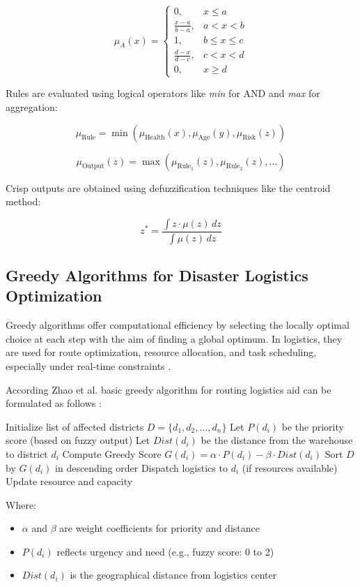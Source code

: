 \documentclass[journal,final,a4paper,twoside,11pt]{IEEEtran}
\begin{document}
\[
\mu_A(x) = 
\begin{cases}
0, & x \leq a \\
\frac{x - a}{b - a}, & a < x < b \\
1, & b \leq x \leq c \\
\frac{d - x}{d - c}, & c < x < d \\
0, & x \geq d
\end{cases}
\]

Rules are evaluated using logical operators like \textit{min} for AND and \textit{max} for aggregation:

\[
\mu_{\text{Rule}} = \min\left( \mu_{\text{Health}}(x), \mu_{\text{Age}}(y), \mu_{\text{Risk}}(z) \right)
\]

\[
\mu_{\text{Output}}(z) = \max \left( \mu_{\text{Rule}_1}(z), \mu_{\text{Rule}_2}(z),\dots \right)
\]

Crisp outputs are obtained using defuzzification techniques like the centroid method:

\[
z^* = \frac{\int z \cdot \mu(z) \, dz}{\int \mu(z) \, dz}
\]

\subsection{Greedy Algorithms for Disaster Logistics Optimization}
Greedy algorithms offer computational efficiency by selecting the locally optimal choice at each step with the aim of finding a global optimum. In logistics, they are used for route optimization, resource allocation, and task scheduling, especially under real-time constraints \cite{garcia2025greedy}.

According Zhao et al. basic greedy algorithm for routing logistics aid can be formulated as follows \cite{zhao2021iterated}:

\begin{algorithmic}
\STATE Initialize list of affected districts $D = \{d_1, d_2, ..., d_n\}$
\STATE Let $P(d_i)$ be the priority score (based on fuzzy output)
\STATE Let $Dist(d_i)$ be the distance from the warehouse to district $d_i$
\STATE Compute Greedy Score $G(d_i) = \alpha \cdot P(d_i) - \beta \cdot Dist(d_i)$
\STATE Sort $D$ by $G(d_i)$ in descending order
    \STATE Dispatch logistics to $d_i$ (if resources available)
    \STATE Update resource and capacity
\ENDFOR
\end{algorithmic}

Where:
\begin{itemize}
    \item $\alpha$ and $\beta$ are weight coefficients for priority and distance
    \item $P(d_i)$ reflects urgency and need (e.g., fuzzy score: 0 to 2)
    \item $Dist(d_i)$ is the geographical distance from logistics center
\end{itemize}
\end{document}
